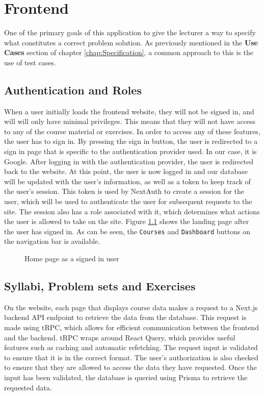 \chapter{Frontend} \label{chap:Frontend}
One of the primary goals of this application to give the lecturer a way to specify what constitutes a correct problem solution.
As previously mentioned in the \textbf{Use Cases} section of chapter \ref{chap:Specification}, a common approach to this is the use of test cases.

\section{Authentication and Roles}
When a user initially loads the frontend website, they will not be signed in, and will will only have minimal privileges.
This means that they will not have access to any of the course material or exercises.
In order to access any of these features, the user has to sign in.
By pressing the sign in button, the user is redirected to a sign in page that is specific to the authentication provider used.
In our case, it is Google.
After logging in with the authentication provider, the user is redirected back to the website.
At this point, the user is now logged in and our database will be updated with the user's information, as well as a token to keep track of the user's session.
This token is used by NextAuth to create a session for the user, which will be used to authenticate the user for subsequent requests to the site.
The session also has a role associated with it, which determines what actions the user is allowed to take on the site.
Figure \ref{fig:Home page} shows the landing page after the user has signed in. As can be seen, the \texttt{Courses} and \texttt{Dashboard} buttons on the navigation bar is available.
\begin{figure}[H]
    \centering
    \caption{Home page as a signed in user}
    \label{fig:Home page}
\end{figure}

\section{Syllabi, Problem sets and Exercises}
On the website, each page that displays course data makes a request to a Next.js backend API endpoint to retrieve the data from the database.
This request is made using tRPC, which allows for efficient communication between the frontend and the backend. tRPC wraps around React Query, which provides useful features such as caching and automatic refetching.
The request input is validated to ensure that it is in the correct format.
The user's authorization is also checked to ensure that they are allowed to access the data they have requested.
Once the input has been validated, the database is queried using Prisma to retrieve the requested data.


